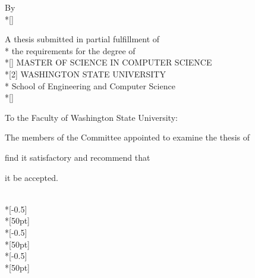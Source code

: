 \doublespacing

\begin{titlepage}
    \begin{center}
        \begin{doublespace}
            {\Large \textbf{\covertitle}}
        \end{doublespace}
	     
        \begin{singlespace}
            \vfill
            By \\*[\baselineskip]
            \textbf{\MakeUppercase \paperauthor}
           
            \vfill
            A thesis submitted in partial fulfillment of\\*
            the requirements for the degree of\\*[\baselineskip]
            MASTER OF SCIENCE IN COMPUTER SCIENCE\\*[2\baselineskip]
            WASHINGTON STATE UNIVERSITY\\*
            School of Engineering and Computer Science\\*[\baselineskip]
            \papermonth ~\paperyear
        \end{singlespace}
    \end{center}
\end{titlepage}

\newpage
\setcounter{page}{2}
\pagestyle{headings}

\vspace*{150pt}
\noindent {}To the Faculty of Washington State University:

The members of the Committee appointed to examine the thesis of

\noindent {} find it satisfactory and recommend that

\noindent {}it be accepted.    

\vspace*{50pt}
	\begin{flushright}
		\makebox[0.5\textwidth]{\hrulefill}\\*[-0.5\baselineskip]
		\\*[50pt]
		\makebox[0.5\textwidth]{\hrulefill}\\*[-0.5\baselineskip]
		\makebox[0.5\textwidth][c]{\secondchair}
		\\*[50pt]
		\makebox[0.5\textwidth]{\hrulefill}\\*[-0.5\baselineskip]
		\makebox[0.5\textwidth][c]{\thirdchair}
		\\*[50pt]
	\end{flushright}

